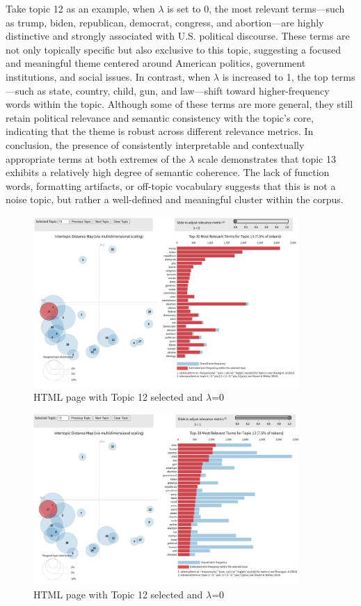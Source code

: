 \documentclass[12pt]{article}
\numberwithin{figure}{section}  %
\begin{document}
	Take topic 12 as an example, when $\lambda$ is set to 0, the most relevant
	terms—such as trump, biden, republican, democrat, congress, and abortion—are
	highly distinctive and strongly associated with U.S. political discourse.
	These terms are not only topically specific but also exclusive to this
	topic, suggesting a focused and meaningful theme centered around American
	politics, government institutions, and social issues.	In contrast, when
	$\lambda$ is increased to 1, the top terms—such as state, country, child,
	gun, and law—shift toward higher-frequency words within the topic. Although
	some of these terms are more general, they still retain political relevance
	and semantic consistency with the topic’s core, indicating that the theme is
	robust across different relevance metrics. In conclusion, the presence of
	consistently interpretable and contextually appropriate terms at both
	extremes of the $\lambda$ scale demonstrates that topic 13 exhibits a
	relatively high degree of semantic coherence. The lack of function words,
	formatting artifacts, or off-topic vocabulary suggests that this is not a
	noise topic, but rather a well-defined and meaningful cluster within the
	corpus.
	\begin{figure}[H]
			\centering
			\includegraphics[width=0.9\textwidth]{Q2r0} 
			\caption{\centering HTML page with Topic 12 selected and $\lambda$=0}		
	\end{figure}
	\begin{figure}[H]
			\centering
			\includegraphics[width=0.9\textwidth]{Q2r1} 
			\caption{\centering HTML page with Topic 12 selected and $\lambda$=0}		
	\end{figure}
\end{document}
